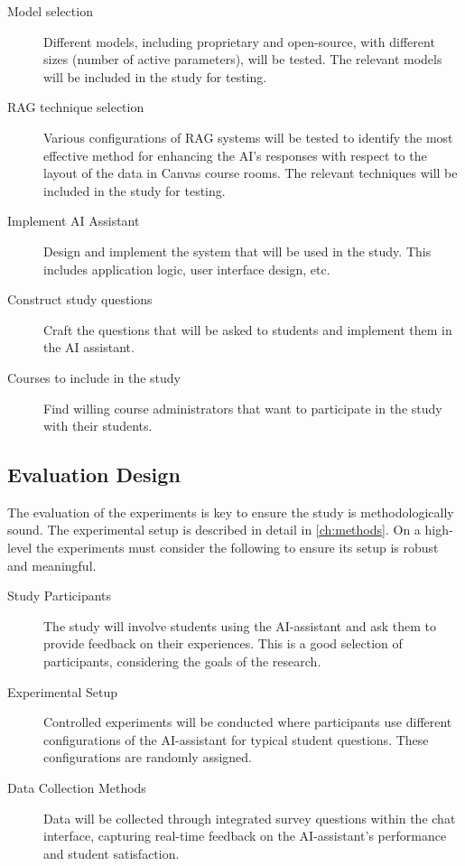 \begin{description}
        \item[Model selection] Different models, including proprietary and open-source, with different sizes (number of active parameters), will be tested. The relevant models will be included in the study for testing.


        \item[RAG technique selection] Various configurations of \gls{RAG} systems will be tested to identify the most effective method for enhancing the AI's responses with respect to the layout of the data in Canvas course rooms. The relevant techniques will be included in the study for testing.


\item[Implement AI Assistant] Design and implement the system that will be used in the study. This includes application logic, user interface design, etc.


\item[Construct study questions] Craft the questions that will be asked to students and implement them in the AI assistant.


\item[Courses to include in the study] Find willing course administrators that want to participate in the study with their students.


\end{description}


\subsection{Evaluation Design}


The evaluation of the experiments is key to ensure the study is methodologically sound. The experimental setup is described in detail in \autoref{ch:methods}. On a high-level the experiments must consider the following to ensure its setup is robust and meaningful.


\begin{description}
        \item[Study Participants] The study will involve students using the AI-assistant and ask them to provide feedback on their experiences. This is a good selection of participants, considering the goals of the research.


\item[Experimental Setup] Controlled experiments will be conducted where participants use different configurations of the AI-assistant for typical student questions. These configurations are randomly assigned.


\item[Data Collection Methods] Data will be collected through integrated survey questions within the chat interface, capturing real-time feedback on the AI-assistant’s performance and student satisfaction.
\end{description}



